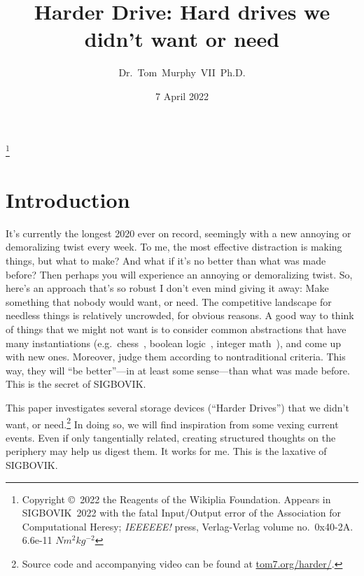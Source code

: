 \documentclass[twocolumn]{article}
\begin{document}
\title{Harder Drive: Hard drives we didn't want or need}
\author{Dr.~Tom~Murphy~VII~Ph.D.}\thanks{
Copyright \copyright\ 2022 the Reagents of the Wikiplia Foundation.
Appears in SIGBOVIK~2022 with the
fatal Input/Output error of the Association for Computational Heresy; {\em IEEEEEE!}
press, Verlag-Verlag volume no.~0x40-2A. 6.6e-11 $N m^2kg^{-2}$
}

\renewcommand\th{\ensuremath{{}^{\textrm{th}}}}
\newcommand\st{\ensuremath{{}^{\textrm{st}}}}
\newcommand\rd{\ensuremath{{}^{\textrm{rd}}}}
\newcommand\nd{\ensuremath{{}^{\textrm{nd}}}}

\renewcommand\paragraph[1]{\smallskip \noindent{\bf #1}\enspace}

\date{7 April 2022}

\maketitle \thispagestyle{empty}

\sloppypar


\section{Introduction}

It's currently the longest 2020 ever on record, seemingly with a new
annoying or demoralizing twist every week. To me, the most effective
distraction is making things, but what to make? And what if it's no
better than what was made before? Then perhaps you will experience an
annoying or demoralizing twist. So, here's an approach that's so
robust I don't even mind giving it away: Make something that nobody
would want, or need. The competitive landscape for needless things is
relatively uncrowded, for obvious reasons. A good way to think of
things that we might not want is to consider common abstractions that
have many instantiations (e.g.~chess~\cite{murphy2019eloworld},
boolean logic~\cite{murphy2019nan}, integer
math~\cite{mccann2018fluint}), and come up with new ones. Moreover,
judge them according to nontraditional criteria. This way, they will
``be better''---in at least some sense---than what was made before.
This is the secret of SIGBOVIK.

This paper investigates several storage devices (``Harder Drives'')
that we didn't want, or need.\footnote{ Source code and accompanying
  video can be found at \url{tom7.org/harder/}. } In
doing so, we will find inspiration from some vexing current events.
Even if only tangentially related, creating structured thoughts on the
periphery may help us digest them. It works for me. This is the
laxative of SIGBOVIK.
\end{document}
